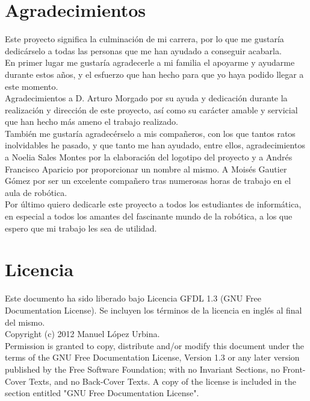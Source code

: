 

\section*{Agradecimientos}

Este proyecto significa la culminación de mi carrera, por lo que me gustaría dedicárselo a todas las personas que me han ayudado a conseguir acabarla.\\

En primer lugar me gustaría agradecerle a mi familia el apoyarme y ayudarme durante estos años, y el esfuerzo que han hecho para que yo haya podido llegar a este momento.\\

Agradecimientos a D. Arturo Morgado por su ayuda y dedicación durante la realización y dirección de este proyecto, así como su carácter amable y servicial que han hecho más ameno el trabajo realizado.\\

También me gustaría agradecérselo a mis compañeros, con los que tantos ratos inolvidables he pasado, y que tanto me han ayudado, entre ellos, agradecimientos a Noelia Sales Montes por la elaboración del logotipo del proyecto y a Andrés Francisco Aparicio por proporcionar un nombre al mismo. A Moisés Gautier Gómez por ser un excelente compañero tras numerosas horas de trabajo en el aula de robótica.\\

Por último quiero dedicarle este proyecto a todos los estudiantes de informática, en especial a todos los amantes del fascinante mundo de la robótica, a los que espero que mi trabajo les sea de utilidad.\\

\cleardoublepage

\section*{Licencia}

Este documento ha sido liberado bajo Licencia GFDL 1.3 (GNU Free Documentation License). Se incluyen los términos de la licencia en inglés al final del mismo.\\

Copyright (c) 2012 Manuel López Urbina.\\

Permission is granted to copy, distribute and/or modify this document under the terms of the GNU Free Documentation License, Version 1.3 or any later version published by the Free Software Foundation; with no Invariant Sections, no Front-Cover Texts, and no Back-Cover Texts. A copy of the license is included in the section entitled "GNU Free Documentation License".\\

\cleardoublepage

